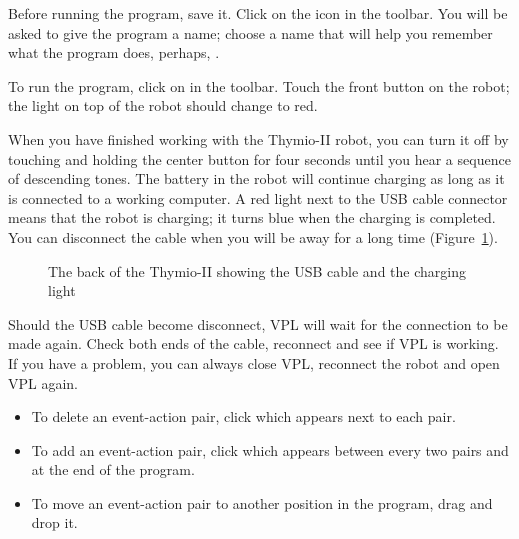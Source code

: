 Before running the program, save it. Click on the icon 
in the toolbar. You will be asked to give the program a name; choose a
name that will help you remember what the program does, perhaps,
.


To run the program, click on  in the toolbar. Touch
the front button on the robot; the light on top of the robot should
change to red.


When you have finished working with the Thymio-II robot, you can turn it
off by touching and holding the center button for four seconds until
you hear a sequence of descending tones. The battery in the robot will
continue charging as long as it is connected to a working computer. A
red light next to the USB cable connector means that the robot is
charging; it turns blue when the charging is completed. You can
disconnect the cable when you will be away for a long time
(Figure~\ref{fig.back}).

\begin{figure}
\begin{center}
\caption{The back of the Thymio-II showing the USB cable and the
 charging light}\label{fig.back}
\end{center}
\end{figure}

Should the USB cable become disconnect, VPL will wait for the connection
to be made again. Check both ends of the cable, reconnect and see if VPL
is working. If you have a problem, you can always close VPL, reconnect
the robot and open VPL again.


\begin{itemize}

\item To delete an event-action pair, click  which
appears next to each pair.

\item To add an event-action pair, click 
which appears between every two pairs and at the end of the program.

\item To move an event-action pair to another position in the
program, drag and drop it.

\end{itemize}


